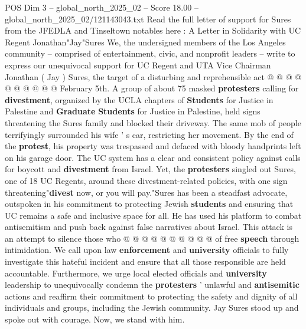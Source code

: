 \begin{textsample}{POS Dim 3 – global\_north\_2025\_02 – Score 18.00 – global\_north\_2025\_02/121143043.txt}
Read the full letter of support for Sures from the JFEDLA and Tinseltown notables here : A Letter in Solidarity with UC Regent Jonathan"Jay"Sures We, the undersigned members of the Los Angeles community -- comprised of entertainment, civic, and nonprofit leaders -- write to express our unequivocal support for UC Regent and UTA Vice Chairman Jonathan ( Jay ) Sures, the target of a disturbing and reprehensible act @ @ @ @ @ @ @ @ @ @ February 5th.
A group of about 75 masked \textbf{protesters} calling for \textbf{divestment}, organized by the UCLA chapters of \textbf{Students} for Justice in Palestine and \textbf{Graduate} \textbf{Students} for Justice in Palestine, held signs threatening the Sures family and blocked their driveway.
The same mob of people terrifyingly surrounded his wife ' s car, restricting her movement.
By the end of the \textbf{protest}, his property was trespassed and defaced with bloody handprints left on his garage door.
The UC system has a clear and consistent policy against calls for boycott and \textbf{divestment} from Israel.
Yet, the \textbf{protesters} singled out Sures, one of 18 UC Regents, around these divestment-related policies, with one sign threatening"\textbf{divest} now, or you will pay."Sures has been a steadfast advocate, outspoken in his commitment to protecting Jewish \textbf{students} and ensuring that UC remains a safe and inclusive space for all.
He has used his platform to combat antisemitism and push back against false narratives about Israel.
This attack is an attempt to silence those who @ @ @ @ @ @ @ @ @ @ of free \textbf{speech} through intimidation.
We call upon law \textbf{enforcement} and \textbf{university} officials to fully investigate this hateful incident and ensure that all those responsible are held accountable.
Furthermore, we urge local elected officials and \textbf{university} leadership to unequivocally condemn the \textbf{protesters} ' unlawful and \textbf{antisemitic} actions and reaffirm their commitment to protecting the safety and dignity of all individuals and groups, including the Jewish community.
Jay Sures stood up and spoke out with courage.
Now, we stand with him.

\end{textsample}
